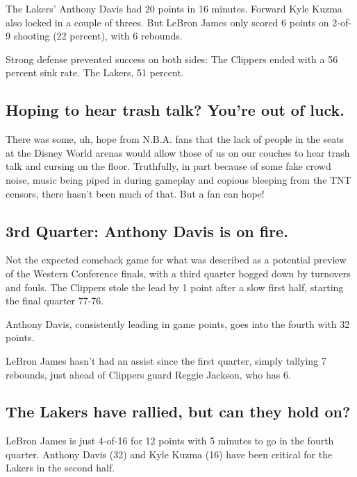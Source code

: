 The Lakers' Anthony Davis had 20 points in 16 minutes. Forward Kyle
Kuzma also locked in a couple of threes. But LeBron James only scored 6
points on 2-of-9 shooting (22 percent), with 6 rebounds.

Strong defense prevented success on both sides: The Clippers ended with
a 56 percent sink rate. The Lakers, 51 percent.

\hypertarget{hoping-to-hear-trash-talk-youre-out-of-luck}{%
\subsection{Hoping to hear trash talk? You're out of
luck.}\label{hoping-to-hear-trash-talk-youre-out-of-luck}}

There was some, uh, hope from N.B.A. fans that the lack of people in the
seats at the Disney World arenas would allow those of us on our couches
to hear trash talk and cursing on the floor. Truthfully, in part because
of some fake crowd noise, music being piped in during gameplay and
copious bleeping from the TNT censors, there hasn't been much of that.
But a fan can hope!

\hypertarget{3rd-quarter-anthony-davis-is-on-fire}{%
\subsection{3rd Quarter: Anthony Davis is on
fire.}\label{3rd-quarter-anthony-davis-is-on-fire}}

Not the expected comeback game for what was described as a potential
preview of the Western Conference finals, with a third quarter bogged
down by turnovers and fouls. The Clippers stole the lead by 1 point
after a slow first half, starting the final quarter 77-76.

Anthony Davis, consistently leading in game points, goes into the fourth
with 32 points.

LeBron James hasn't had an assist since the first quarter, simply
tallying 7 rebounds, just ahead of Clippers guard Reggie Jackson, who
has 6.

\hypertarget{the-lakers-have-rallied-but-can-they-hold-on}{%
\subsection{The Lakers have rallied, but can they hold
on?}\label{the-lakers-have-rallied-but-can-they-hold-on}}

LeBron James is just 4-of-16 for 12 points with 5 minutes to go in the
fourth quarter. Anthony Davis (32) and Kyle Kuzma (16) have been
critical for the Lakers in the second half.

